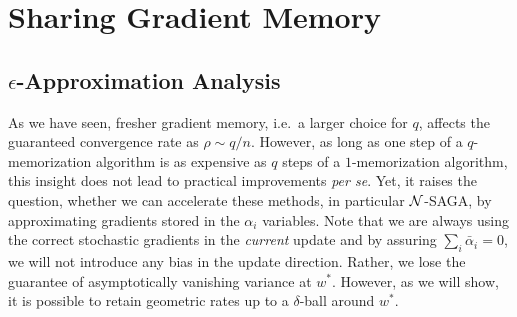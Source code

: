 %

\section{Sharing Gradient Memory}
\label{sect:sharing}

\subsection{$\epsilon$-Approximation Analysis} 

As we have seen, fresher gradient memory, i.e.~a larger choice for $q$, affects the guaranteed convergence rate as $\rho \sim q/n$. However, as long as one step of a $q$-memorization algorithm is as expensive as $q$ steps of a $1$-memorization algorithm, this insight does not lead to practical improvements \textit{per se}. Yet, it raises the question, whether we can accelerate these methods, in particular ${\cal N}$-SAGA, by approximating gradients stored in the $\alpha_i$ variables. Note that we are always using the correct stochastic gradients in the \textit{current} update and by assuring $\sum_{i} \bar\alpha_i=0$, we will not introduce any bias in the update direction. Rather, we lose the guarantee of asymptotically vanishing variance at $w^*$. However, as we will show, it is possible to retain geometric rates up to a $\delta$-ball around $w^*$. 

